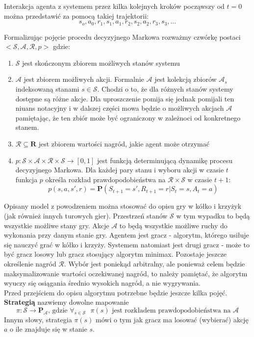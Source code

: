 \documentclass[licencjacka]{pracamgr}
\begin{document}
 Interakcja agenta z systemem przez kilka kolejnych kroków począwszy od $t=0$ można przedstawić za pomocą takiej trajektorii:
$$s_{o}, a_{0}, r_{1}, s_{1}, a_{1}, r_{2}, s_{2}, a_{2}, r_{3}, s_{3},...$$

Formalizując pojęcie procedu decyzyjnego Markowa  rozważmy czwórkę postaci $<\mathcal{S},\mathcal{A},\mathcal{R},p>$ gdzie:
\begin{enumerate}
 	\item{$\mathcal{S}$ jest skończonym zbiorem możliwych stanów systemu}
	\item{$\mathcal{A}$ jest zbiorem możliwych akcji. Formalnie $\mathcal{A}$ jest kolekcją zbiorów $\mathcal{A}_{s}$ indeksowaną stanami $s\in\mathcal{S}$. Chodzi o to, że dla różnych stanów systemy dostępne są różne akcje.  Dla uproszczenie pomija się jednak pomijali ten niuans notacyjny i w dalszej części mowa będzie o możliwych akcjach $\mathcal{A}$  pamiętając, że ten zbiór może być ograniczony w zależnoci od konkretnego stanem.}
	\item{$\mathcal{R}\subseteq\mathbf{R}$ jest zbiorem wartości nagród, jakie agent może otrzymać}
	\item{$p:\mathcal{S}\times\mathcal{A}\times\mathcal{R}\times\mathcal{S}\rightarrow [0,1]$ jest funkcją determinującą dynamikę procesu decyzyjnego Markowa. Dla każdej pary stanu i wyboru akcji w czasie $t$ funkcja $p$ określa rozkład prawdopodobieństwa na $\mathcal{R}\times\mathcal{S}$ w czasie $t+1$:  $$p(s, a, s', r) = \mathbf{P}(S_{t+1}=s', R_{t+1}=r | S_{t}=s, A_{t}=a )$$}
\end{enumerate}

Opisany model z powodzeniem można stosować do opisu gry w kółko i krzyżyk (jak również innych turowych gier). Przestrzeń stanów $\mathcal{S}$ w tym wypadku to będą wszystkie możliwe stany gry. Akcje $\mathcal{A}$ to będą wszystkie możliwe ruchy do wykonania przy danym stanie gry. Agentem jest gracz - algorytm, którego usiłuje się nauczyć grać w kółko i krzyży. Systemem natomiast jest drugi gracz - może to być gracz losowy lub gracz stosujący algorytm minimax. Pozostaje jeszcze określenie nagród $\mathcal{R}$. Wybór jest poniekąd arbitralny, ale ponieważ celem będzie maksymalizowanie wartości oczekiwanej nagród, to należy pamiętać, że algorytm wyuczy się osiągania średnio wysokich nagród, a nie wygrywania. \\

Przed przejściem do opisu algorytmu potrzebne będzie jeszcze kilka pojęć. \textbf{Strategią} nazwiemy dowolne mapowanie 
$$\pi : \mathcal{S}\rightarrow\mathbf{P}_{\mathcal{A}} \text{, gdzie } \forall_{s\in\mathcal{S}} \text{ } \pi(s) \text {  jest rozkładem prawdopodobieństwa na } \mathcal{A}$$ 
Innym słowy, strategia $\pi(s)$ mówi o tym jak gracz ma losować (wybierać) akcję $a$ o ile znajduje się w stanie $s$.\\
\end{document}
